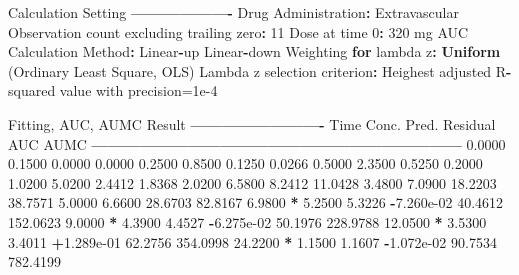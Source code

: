 \documentclass[12pt,]{krantz}
\newenvironment{Shaded}{\begin{snugshade}}{\end{snugshade}}
\newcommand{\KeywordTok}[1]{\textcolor[rgb]{0.13,0.29,0.53}{\textbf{#1}}}
\newcommand{\DecValTok}[1]{\textcolor[rgb]{0.00,0.00,0.81}{#1}}
\newcommand{\FloatTok}[1]{\textcolor[rgb]{0.00,0.00,0.81}{#1}}
\newcommand{\StringTok}[1]{\textcolor[rgb]{0.31,0.60,0.02}{#1}}
\newcommand{\ControlFlowTok}[1]{\textcolor[rgb]{0.13,0.29,0.53}{\textbf{#1}}}
\newcommand{\OperatorTok}[1]{\textcolor[rgb]{0.81,0.36,0.00}{\textbf{#1}}}
\newcommand{\NormalTok}[1]{#1}
\theoremstyle{definition}
\theoremstyle{definition}
\theoremstyle{definition}
\theoremstyle{remark}
\begin{document}
\begin{Shaded}
\begin{Highlighting}[]
{{{{\NormalTok{Calculation Setting}
\OperatorTok{-------------------}
\NormalTok{Drug Administration}\OperatorTok{:}\StringTok{ }\NormalTok{Extravascular}
\NormalTok{Observation count excluding trailing zero}\OperatorTok{:}\StringTok{ }\DecValTok{11}
\NormalTok{Dose at time }\DecValTok{0}\OperatorTok{:}\StringTok{ }\DecValTok{320}\NormalTok{ mg}
\NormalTok{AUC Calculation Method}\OperatorTok{:}\StringTok{ }\NormalTok{Linear}\OperatorTok{-}\NormalTok{up Linear}\OperatorTok{-}\NormalTok{down}
\NormalTok{Weighting }\ControlFlowTok{for}\NormalTok{ lambda z}\OperatorTok{:}\StringTok{ }\KeywordTok{Uniform}\NormalTok{ (Ordinary Least Square, OLS)}
\NormalTok{Lambda z selection criterion}\OperatorTok{:}\StringTok{ }\NormalTok{Heighest adjusted R}\OperatorTok{-}\NormalTok{squared value with precision=}\FloatTok{1e-4}


\NormalTok{Fitting, AUC, AUMC Result}
\OperatorTok{-------------------------}
\StringTok{      }\NormalTok{Time         Conc.      Pred.   Residual       AUC       AUMC}
\OperatorTok{---------------------------------------------------------------------}
\StringTok{     }\FloatTok{0.0000}       \FloatTok{0.1500}                           \FloatTok{0.0000}     \FloatTok{0.0000}
     \FloatTok{0.2500}       \FloatTok{0.8500}                           \FloatTok{0.1250}     \FloatTok{0.0266}
     \FloatTok{0.5000}       \FloatTok{2.3500}                           \FloatTok{0.5250}     \FloatTok{0.2000}
     \FloatTok{1.0200}       \FloatTok{5.0200}                           \FloatTok{2.4412}     \FloatTok{1.8368}
     \FloatTok{2.0200}       \FloatTok{6.5800}                           \FloatTok{8.2412}    \FloatTok{11.0428}
     \FloatTok{3.4800}       \FloatTok{7.0900}                          \FloatTok{18.2203}    \FloatTok{38.7571}
     \FloatTok{5.0000}       \FloatTok{6.6600}                          \FloatTok{28.6703}    \FloatTok{82.8167}
     \FloatTok{6.9800} \OperatorTok{*}\StringTok{     }\FloatTok{5.2500}     \FloatTok{5.3226} \OperatorTok{-}\FloatTok{7.260e-02}    \FloatTok{40.4612}   \FloatTok{152.0623}
     \FloatTok{9.0000} \OperatorTok{*}\StringTok{     }\FloatTok{4.3900}     \FloatTok{4.4527} \OperatorTok{-}\FloatTok{6.275e-02}    \FloatTok{50.1976}   \FloatTok{228.9788}
    \FloatTok{12.0500} \OperatorTok{*}\StringTok{     }\FloatTok{3.5300}     \FloatTok{3.4011} \OperatorTok{+}\FloatTok{1.289e-01}    \FloatTok{62.2756}   \FloatTok{354.0998}
    \FloatTok{24.2200} \OperatorTok{*}\StringTok{     }\FloatTok{1.1500}     \FloatTok{1.1607} \OperatorTok{-}\FloatTok{1.072e-02}    \FloatTok{90.7534}   \FloatTok{782.4199}

}}}}
\end{Highlighting}
\end{Shaded}
\end{document}
